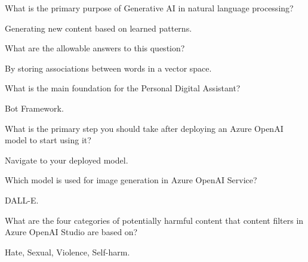 \begin{qanda}
	\begin{question}
What is the primary purpose of Generative AI in natural language processing?
	\end{question}
	\begin{answer}
Generating new content based on learned patterns.
	\end{answer}
\end{qanda}

\begin{qanda}
	\begin{question}
What are the allowable answers to this question?
	\end{question}
	\begin{answer}
By storing associations between words in a vector space.
	\end{answer}
\end{qanda}

\begin{qanda}
	\begin{question}
What is the main foundation for the Personal Digital Assistant?
	\end{question}
	\begin{answer}
Bot Framework.
	\end{answer}
\end{qanda}

\begin{qanda}
	\begin{question}
What is the primary step you should take after deploying an Azure OpenAI model to start using it?
	\end{question}
	\begin{answer}
Navigate to your deployed model.
	\end{answer}
\end{qanda}

\begin{qanda}
	\begin{question}
Which model is used for image generation in Azure OpenAI Service?
	\end{question}
	\begin{answer}
DALL-E.
	\end{answer}
\end{qanda}

\begin{qanda}
	\begin{question}
What are the four categories of potentially harmful content that content filters in Azure OpenAI Studio are based on?
	\end{question}
	\begin{answer}
Hate, Sexual, Violence, Self-harm.
	\end{answer}
\end{qanda}

